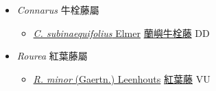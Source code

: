 
  \begin{itemize}
 \item[] \textit{Connarus} 牛栓藤屬
                    
  \begin{itemize}
        \item[] \href{http://www.theplantlist.org/tpl1.1/search?q=Connarus+subinaequifolius}{\textit{C. subinaequifolius} Elmer}   \href{\detokenize{http://taibnet.sinica.edu.tw/chi/taibnet_species_list.php?T2=蘭嶼牛栓藤&T2_new_value=true&fr=y}}{蘭嶼牛栓藤} DD
  \end{itemize}
 \item[] \textit{Rourea} 紅葉藤屬
                    
  \begin{itemize}
        \item[] \href{http://www.theplantlist.org/tpl1.1/search?q=Rourea+minor}{\textit{R. minor} (Gaertn.) Leenhouts}   \href{\detokenize{http://taibnet.sinica.edu.tw/chi/taibnet_species_list.php?T2=紅葉藤&T2_new_value=true&fr=y}}{紅葉藤} VU
  \end{itemize}
  \end{itemize}
